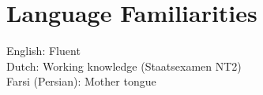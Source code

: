 \section{Language Familiarities}
English: Fluent \\
Dutch: Working knowledge (Staatsexamen NT2) \\
Farsi (Persian): Mother tongue
